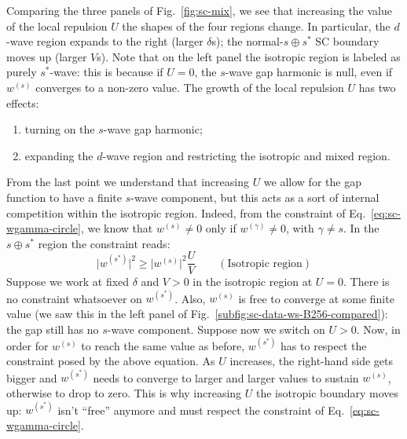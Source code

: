 Comparing the three panels of Fig.~\ref{fig:sc-mix}, we see that increasing the value of the local repulsion $U$
the shapes of the four regions change. In particular, the $d$-wave region expands to the right (larger $\delta$s); the normal-$s \oplus s^*$ SC boundary moves up (larger $V$s). Note that on the left panel the isotropic region is labeled as purely $s^*$-wave: this is because if $U=0$, the $s$-wave gap harmonic is null, even if $w^{(s)}$ converges to a non-zero value. The growth of the local repulsion $U$ has two effects:
\begin{enumerate}
	\item turning on the $s$-wave gap harmonic;
	\item expanding the $d$-wave region and restricting the isotropic and mixed region.
\end{enumerate}
From the last point we understand that increasing $U$ we allow for the gap function to have a finite $s$-wave component, but this acts as a sort of internal competition within the isotropic region. Indeed, from the constraint of Eq.~\eqref{eq:sc-wgamma-circle}, we know that $w^{(s)} \neq 0$ only if $w^{(\gamma)} \neq 0$, with $\gamma \neq s$. In the $s \oplus s^*$ region the constraint reads:
\[
	\big| w^{(s^*)} \big|^2 \ge \big| w^{(s)} \big|^2 \frac{U}{V}
	\qquad
	(\text{Isotropic region})
\] 
Suppose we work at fixed $\delta$ and $V>0$ in the isotropic region at $U=0$. There is no constraint whatsoever on $w^{(s^*)}$. Also, $w^{(s)}$ is free to converge at some finite value (we saw this in the left panel of Fig.~\ref{subfig:sc-data-ws-B256-compared}): the gap still has no $s$-wave component. Suppose now we switch on $U>0$. Now, in order for $w^{(s)}$ to reach the same value as before, $w^{(s^*)}$ has to respect the constraint posed by the above equation. As $U$ increases, the right-hand side gets bigger and $w^{(s^*)}$ needs to converge to larger and larger values to sustain $w^{(s)}$, otherwise to drop to zero. This is why increasing $U$ the isotropic boundary moves up: $w^{(s^*)}$ isn't ``free'' anymore and must respect the constraint of Eq.~\eqref{eq:sc-wgamma-circle}.


